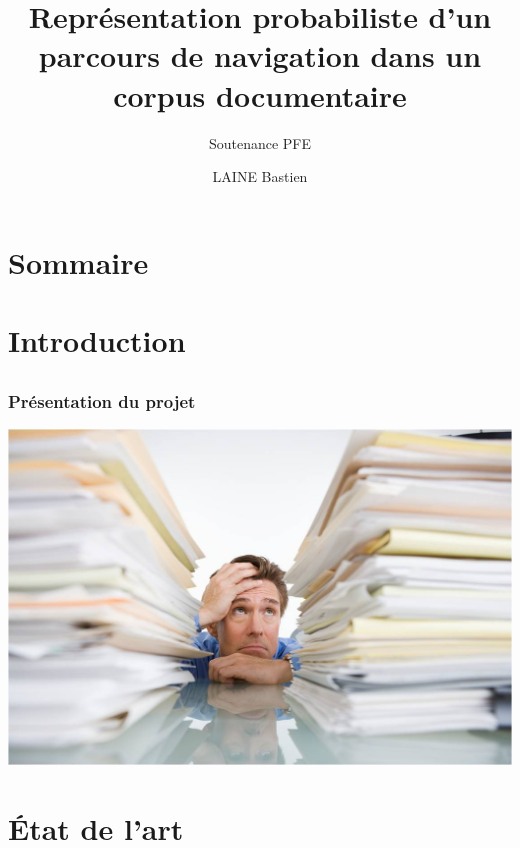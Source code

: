 \documentclass{beamer}
\title{Représentation probabiliste d’un parcours de navigation dans un corpus documentaire}
\subtitle{Soutenance PFE}
\author{LAINE Bastien}
\institute{Génie Mathématique | INSA Rouen}
\begin{document}
    \beamertemplatenavigationsymbolsempty

    \begin{frame}
        \titlepage{}
    \end{frame}

    \section*{Sommaire}
        \begin{frame}
            \tableofcontents
        \end{frame}

    \section{Introduction}
        \subsection{}
            \begin{frame}
                \frametitle{Présentation du projet}
                \begin{center}
                    \includegraphics[scale=0.4]{images/overwhelmed.jpg}
                \end{center}
            \end{frame}

    \section{État de l'art}
\end{document}
